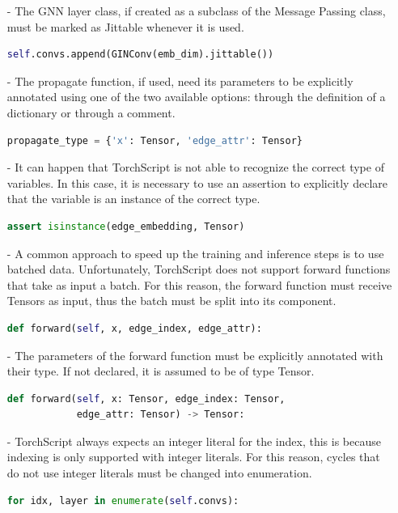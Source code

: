 \begin{itemize}
    \item[-] The GNN layer class, if created as a subclass of the Message Passing class, must be marked as Jittable whenever it is used.
\begin{lstlisting}[language=Python,label={lst:jittable}]
self.convs.append(GINConv(emb_dim).jittable())
\end{lstlisting}
    \item[-] The propagate function, if used, need its parameters to be explicitly annotated using one of the two available options: through the definition of a dictionary or through a comment.
\begin{lstlisting}[language=Python,label={lst:propagate-annotation}]
propagate_type = {'x': Tensor, 'edge_attr': Tensor}
\end{lstlisting}
    \item[-] It can happen that TorchScript is not able to recognize the correct type of variables.
    In this case, it is necessary to use an assertion to explicitly declare that the variable is an instance of the correct type.
\begin{lstlisting}[language=Python,label={lst:isinstance-assertion}]
assert isinstance(edge_embedding, Tensor)
\end{lstlisting}
    \item[-] A common approach to speed up the training and inference steps is to use batched data.
    Unfortunately, TorchScript does not support forward functions that take as input a batch.
    For this reason, the forward function must receive Tensors as input, thus the batch must be split into its component.
\begin{lstlisting}[language=Python,label={lst:splitted-forward}]
def forward(self, x, edge_index, edge_attr):
\end{lstlisting}
    \item[-] The parameters of the forward function must be explicitly annotated with their type.
    If not declared, it is assumed to be of type Tensor.
\begin{lstlisting}[language=Python,label={lst:forward-annotation}]
def forward(self, x: Tensor, edge_index: Tensor,
            edge_attr: Tensor) -> Tensor:
\end{lstlisting}
    \item[-] TorchScript always expects an integer literal for the index, this is because indexing is only supported with integer literals.
    For this reason, cycles that do not use integer literals must be changed into enumeration.
\begin{lstlisting}[language=Python,label={lst:enumeration}]
for idx, layer in enumerate(self.convs):
\end{lstlisting}
\end{itemize}


